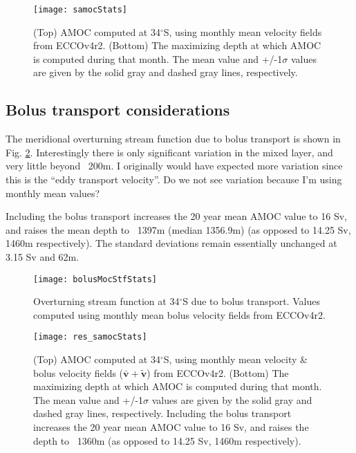 \documentclass[a4paper,11pt]{article}
\newcommand{\degSym}{$^{\circ}$}
\begin{document}
   \begin{figure}
    \centering
    \texttt{[image: samocStats]}
    \caption{(Top) AMOC computed at 34\degSym S, using monthly mean velocity fields from ECCOv4r2. (Bottom) The maximizing depth at which AMOC is computed during that month. The mean value and +/-1$\sigma$ values are given by the solid gray and dashed gray lines, respectively.}
    \label{fig:samocStats}
   \end{figure}

   
   \subsection{Bolus transport considerations}
   \label{bolus}
   
   The meridional overturning stream function due to bolus transport is shown in Fig. \ref{fig:bolusMocStfStats}. Interestingly there is only significant variation in the mixed layer, and very little beyond ~200m. I originally would have expected more variation since this is the ``eddy transport velocity''. Do we not see variation because I'm using monthly mean values? 
   
   Including the bolus transport increases the 20 year mean AMOC value to 16 Sv, and raises the mean depth to ~1397m (median 1356.9m) (as opposed to 14.25 Sv, 1460m respectively). The standard deviations remain essentially unchanged at 3.15 Sv and 62m. 
   
   \begin{figure}
    \centering
    \texttt{[image: bolusMocStfStats]}
    \caption{Overturning stream function at 34\degSym S due to bolus transport. Values computed using monthly mean bolus velocity fields from ECCOv4r2.}
    \label{fig:bolusMocStfStats}
   \end{figure}
   
   \begin{figure}
    \centering
    \texttt{[image: res\_samocStats]}
    \caption{(Top) AMOC computed at 34\degSym S, using monthly mean velocity \& bolus velocity fields ($\bar{\mathbf{v}}+\tilde{\mathbf{v}}$) from ECCOv4r2. (Bottom) The maximizing depth at which AMOC is computed during that month. The mean value and +/-1$\sigma$ values are given by the solid gray and dashed gray lines, respectively. Including the bolus transport increases the 20 year mean AMOC value to 16 Sv, and raises the depth to ~1360m (as opposed to 14.25 Sv, 1460m respectively).}
    \label{fig:res_samocStats}
   \end{figure}
\end{document}
